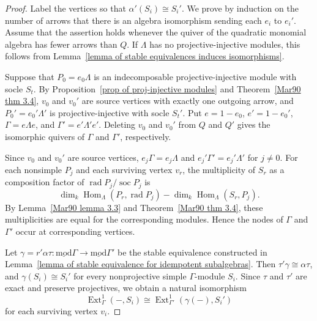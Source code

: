 \documentclass[11pt]{article}
\newcommand{\soc}{\operatorname{soc}}
\newcommand{\rad}{\operatorname{rad}}
\newcommand{\Hom}{\operatorname{Hom}}
\newcommand{\Ext}{\operatorname{Ext}}
\newcommand{\smod}{\operatorname{\underline{mod}}}
\providecommand{\varLambda}{\Lambda}
\providecommand{\varGamma}{\Gamma}
\theoremstyle{definition}
\begin{document}
		\begin{proof}
			Label the vertices so that $\alpha'(S_i)\cong S_i'$.
			We prove by induction on the number of arrows that there is an algebra isomorphism sending each $e_i$ to $e_i'$.
			Assume that the assertion holds whenever the quiver of the quadratic monomial algebra has fewer arrows than $Q$.
			If $\varLambda$ has no  projective-injective modules, this follows from Lemma~\ref{lemma of stable equivalences induces isomorphisms}.

			Suppose that $P_0=e_0\varLambda$ is an indecomposable projective-injective module with socle $S_t$.
			By Proposition~\ref{prop of proj-injective modules} and Theorem~\ref{Mar90 thm 3.4}, $v_0$ and $v_0'$ are source vertices with exactly one outgoing arrow, and $P_0'=e_0'\varLambda'$ is projective-injective with socle $S_t'$.
			Put $e=1-e_0$, $e'=1-e_0'$, $\varGamma=e\varLambda e$, and $\varGamma'=e'\varLambda'e'$.
			Deleting $v_0$ and $v_0'$ from $Q$ and $Q'$ gives the isomorphic quivers of $\varGamma$ and $\varGamma'$, respectively.

			Since $v_0$ and $v_0'$ are source vertices, $e_j\varGamma=e_j\varLambda$ and $e_j'\varGamma'=e_j'\varLambda'$ for $j\ne0$.
			For each nonsimple $P_j$ and each surviving vertex $v_r$, the multiplicity of $S_r$ as a composition factor of $\rad P_j/\soc P_j$ is 
			\[\dim_k\Hom_{\varLambda}(P_r,\rad P_j)-\dim_k\Hom_{\varLambda}(S_r,P_j).\]
			By Lemma~\ref{Mar90 lemma 3.3} and Theorem~\ref{Mar90 thm 3.4}, these multiplicities are equal for the corresponding modules.
			Hence the nodes of $\varGamma$ and $\varGamma'$ occur at corresponding vertices.

			Let $\gamma=r'\alpha\tau:\smod\varGamma\to\smod\varGamma'$ be the stable equivalence constructed in Lemma~\ref{lemma of stable equivalence for idempotent subalgebras}.
			Then $\tau'\gamma\cong\alpha\tau$, and $\gamma(S_i)\cong S_i'$ for every nonprojective simple $\varGamma$-module $S_i$.
			Since $\tau$ and $\tau'$ are exact and preserve projectives, we obtain a natural isomorphism
			\begin{equation}\label{eq simple Ext correspondence for idempotent subalgebras}
				\Ext^1_\varGamma(-,S_i)
				\cong\Ext^1_{\varGamma'}(\gamma(-),S_i')
			\end{equation}
			for each surviving vertex $v_i$.


\end{proof}
\end{document}
